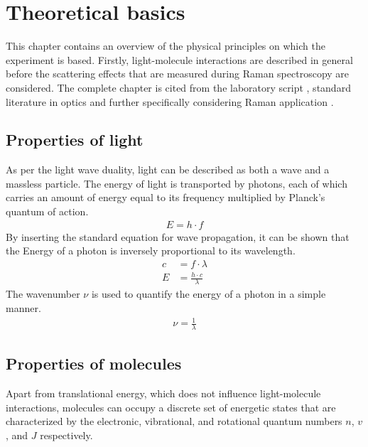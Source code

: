 
\chapter{Theoretical basics}
\label{chap:theoretical}

This chapter contains an overview of the physical principles on which the experiment is based. Firstly, light-molecule interactions are described in general before the scattering effects that are measured during Raman spectroscopy are considered. The complete chapter is cited from the laboratory script \autocite{brauerApplicationRamanSpectroscopy2022}, standard literature in optics \autocite{bornPrinciplesOpticsElectromagnetic1999,hechtOptik2005,lipsonOptik1997,niedrigOptikWellenUnd2004} and further specifically considering Raman application \autocite{herzbergMolecularSpectraMolecular2013,schraderInfraredRamanSpectroscopy1995}. 

\section{Properties of light}

As per the light wave duality, light can be described as both a wave and a massless particle. The energy of light is transported by photons, each of which carries an amount of energy equal to its frequency multiplied by Planck’s quantum of action.
\begin{align}
    E=h \cdot f
\end{align}
By inserting the standard equation for wave propagation, it can be shown that the Energy of a photon is inversely proportional to its wavelength.
\begin{align}
    c&=f \cdot \lambda \\
    E&= \frac{h \cdot c}{\lambda}
\end{align}
The wavenumber $\nu$ is used to quantify the energy of a photon in a simple manner.
\begin{align}
    \nu=\frac{1}{\lambda}
\end{align}

\section{Properties of molecules}

Apart from translational energy, which does not influence light-molecule interactions, molecules can occupy a discrete set of energetic states that are characterized by the electronic, vibrational, and rotational quantum numbers $n$, $v$, and $J$ respectively.

